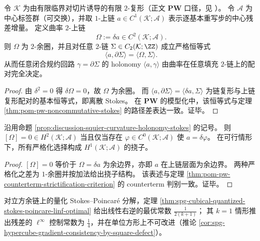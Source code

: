 \begin{proposition}\label{prop:discussion-squier-curvature-holonomy-stokes}
令 \(\mathcal K\) 为由有限临界对切片诱导的有限 \(2\)-复形（正文 \(\mathbf{PW}\) 口径，见 ）。
令 \(\mathcal A\) 为中心标签群（可交换），并取 \(1\)-上链 \(a\in C^1(\mathcal K;\mathcal A)\) 表示逐基本重写步的中心残差增量。
定义曲率 \(2\)-上链
\[
\Omega:=\delta a\in C^2(\mathcal K;\mathcal A).
\]
则 \(\Omega\) 为 \(2\)-余圈，并且对任意 \(2\)-链 \(\Sigma\in C_2(\mathcal K;\ZZ)\) 成立严格恒等式
\[
\boxed{\;\langle a,\partial\Sigma\rangle=\langle \Omega,\Sigma\rangle.\;}
\]
从而任意闭合规约回路 \(\gamma=\partial\Sigma\) 的 holonomy \(\langle a,\gamma\rangle\) 由曲率在任意填充 \(2\)-链上的配对完全决定。
\end{proposition}
\begin{proof}
由 \(\delta^2=0\) 得 \(\delta\Omega=0\)，故 \(\Omega\) 为余圈。
而 \(\langle a,\partial\Sigma\rangle=\langle \delta a,\Sigma\rangle\) 为链复形与上链复形配对的基本恒等式，即离散 Stokes。
在 \(\mathbf{PW}\) 的模型化中，该恒等式与定理 \ref{thm:pom-pw-noncommutative-stokes} 的路径差表达一致。证毕。
\end{proof}

\begin{corollary}[严格化的判别与参数空间]\label{cor:discussion-squier-zero-curvature-strictification}
沿用命题 \ref{prop:discussion-squier-curvature-holonomy-stokes} 的记号。
则 \([\Omega]=0\in H^2(\mathcal K;\mathcal A)\) 当且仅当存在 \(\varphi\in C^0(\mathcal K;\mathcal A)\) 使 \(a=\delta\varphi\)。
在可行情形下，所有严格化选择构成 \(H^1(\mathcal K;\mathcal A)\) 的挠子。
\end{corollary}
\begin{proof}
\([\Omega]=0\) 等价于 \(\Omega=\delta a\) 为余边界，亦即 \(a\) 在上链层面为余边界。
两种严格化之差为 \(1\)-余圈并按加法给出挠子结构。
该表述与定理 \ref{thm:pom-pw-counterterm-strictification-criterion} 的 counterterm 判别一致。证毕。
\end{proof}

\begin{remark}\label{rem:discussion-linf-strictification-quarter}
对立方余链上的量化 Stokes--Poincar\'e 分解，定理 \ref{thm:spg-cubical-quantized-stokes-poincare-linf-optimal} 给出线性右逆的最优常数 \(\frac{1}{2(k+1)}\)；
其 \(k=1\) 情形推出残差的 \(\ell^\infty\) 控制常数为 \(\frac14\)，并在单位方形上不可改进（推论 \ref{cor:spg-hypercube-gradient-consistency-by-square-defect}）。
\end{remark}

